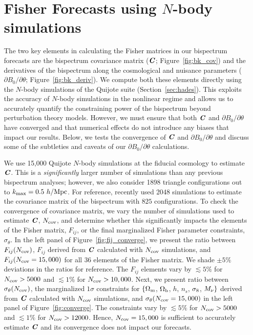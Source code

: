\section{Fisher Forecasts using $N$-body simulations} \label{sec:numerical}
The two key elements in calculating the Fisher matrices in our bispectrum forecasts
are the bispectrum covariance matrix ($\textbf{\textit{C}}$; Figure~\ref{fig:bk_cov}) and 
the derivatives of the bispectrum along the cosmological and nuisance parameters 
($\partial B_0/\partial \theta$; Figure~\ref{fig:bk_deriv}). We compute 
both these elements directly using the $N$-body simulations of the Quijote suite 
(Section~\ref{sec:hades}). This exploits the accuracy of $N$-body simulations in 
the nonlinear regime and allows us to accurately quantify the constraining power of 
the bispectrum beyond perturbation theory models. However, we must ensure that 
both $\textbf{\textit{C}}$ and $\partial B_0/\partial \theta$ have converged and that numerical 
effects do not introduce any biases that impact our results. Below, we tests 
the convergence of $\textbf{\textit{C}}$ and $\partial B_0/\partial \theta$ and discuss
some of the subtleties and caveats of our $\partial B_0/\partial \theta$ 
calculations. 

We use 15,000 Quijote $N$-body simulations at the fiducial cosmology to 
estimate $\textbf{\textit{C}}$. This is a \emph{significantly} larger number of simulations 
than any previous bispectrum analyses; however, we also consider 1898 triangle 
configurations out to $k_{\rm max} = 0.5~h/{\rm Mpc}$. For reference, \cite{gil-marin2017} 
recently used 2048 simulations to estimate the covariance matrix of the 
bispectrum with $825$ configurations. To check the convergence of covariance 
matrix, we vary the number of simulations used to estimate $\textbf{\textit{C}}$, 
$N_{\rm cov}$, and determine whether this significantly impacts the elements 
of the Fisher matrix, $F_{ij}$, or the final marginalized Fisher parameter 
constraints, $\sigma_\theta$. In the left panel of Figure~\ref{fig:fij_converge}, 
we present the ratio between $F_{ij}(N_{\rm cov})$, $F_{ij}$ derived from 
$\textbf{\textit{C}}$ calculated with $N_{\rm cov}$ simulations, and 
$F_{ij}(N_{\rm cov} = 15,000)$ for all 36 elements of the Fisher matrix. We 
shade $\pm5\%$ deviations in the ratios for reference. The $F_{ij}$ elements 
vary by $\lesssim 5\%$ for $N_{\rm cov} > 5000$ and $\lesssim 1\%$ for 
$N_{\rm cov} > 10,000$. Next, we present ratio between $\sigma_\theta(N_{\rm cov})$, 
the marginalized $1\sigma$ constraints for $\{\Omega_{\rm m}$, $\Omega_{\rm b}$, $h$, $n_s$, $\sigma_8$, $M_\nu\}$ 
derived from $\textbf{\textit{C}}$ calculated with $N_{\rm cov}$ simulations, and 
$\sigma_\theta(N_{\rm cov} = 15,000)$ in the left panel of Figure~\ref{fig:converge}. 
The constraints vary by $\lesssim 5\%$ for $N_{\rm cov} > 5000$ and $\lesssim 1\%$ 
for $N_{\rm cov} > 12000$. Hence, $N_{\rm cov} = 15,000$ is sufficient to 
accurately estimate $\textbf{\textit{C}}$ and its convergence does not impact our 
forecasts.


